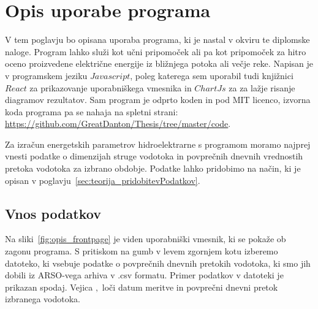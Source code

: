 \chapter{Opis uporabe programa}


V tem poglavju bo opisana uporaba programa, ki je nastal v okviru te diplomske naloge. Program lahko služi kot učni pripomoček ali pa kot pripomoček za hitro oceno proizvedene električne energije iz bližnjega potoka ali večje reke. Napisan je v programskem jeziku $Javascript$, poleg katerega sem uporabil tudi knjižnici $React$ za prikazovanje uporabniškega vmesnika in $ChartJs$ za za lažje risanje diagramov rezultatov. Sam program je odprto koden in pod MIT licenco, izvorna koda programa pa se nahaja na spletni strani: \href{https://github.com/GreatDanton/Thesis/tree/master/code}{https://github.com/GreatDanton/Thesis/tree/master/code}.

Za izračun energetskih parametrov hidroelektrarne s programom moramo najprej vnesti podatke o dimenzijah struge vodotoka in povprečnih dnevnih vrednostih pretoka vodotoka za izbrano obdobje. Podatke lahko pridobimo na način, ki je opisan v poglavju~\ref{sec:teorija_pridobitevPodatkov}.




\section{Vnos podatkov}
Na sliki~\ref{fig:opis_frontpage} je viden uporabniški vmesnik, ki se pokaže ob zagonu programa. S pritiskom na gumb v levem zgornjem kotu izberemo datoteko, ki vsebuje podatke o povprečnih dnevnih pretokih vodotoka, ki smo jih dobili iz ARSO-vega arhiva v .csv formatu. Primer podatkov v datoteki je prikazan spodaj. Vejica $,$ loči datum meritve in povprečni dnevni pretok izbranega vodotoka.

